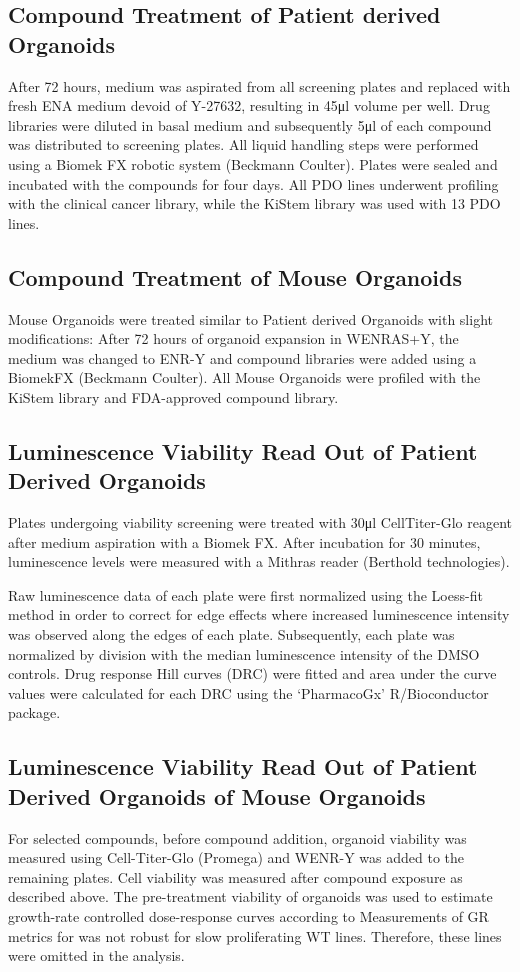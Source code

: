 \begin{flushleft}
\subsection{Compound Treatment of Patient derived Organoids}
After 72 hours, medium was aspirated from all screening plates and replaced with fresh ENA medium devoid of Y-27632, resulting in 45μl volume per well. Drug libraries were diluted in basal medium and subsequently 5μl of each compound was distributed to screening plates. 
All liquid handling steps were performed using a Biomek FX robotic system (Beckmann Coulter). Plates were sealed and incubated with the compounds for four days. All PDO lines underwent profiling with the clinical cancer library, while the KiStem library was used with 13 PDO lines.

\subsection{Compound Treatment of Mouse Organoids}
Mouse Organoids were treated similar to Patient derived Organoids with slight modifications: After 72 hours of organoid expansion in WENRAS+Y, the medium was changed to ENR-Y and compound libraries were added using a BiomekFX (Beckmann Coulter). All Mouse Organoids were profiled with the KiStem library and FDA-approved compound library.

\subsection{Luminescence Viability Read Out of Patient Derived Organoids}
Plates undergoing viability screening were treated with 30μl CellTiter-Glo reagent after medium aspiration with a Biomek FX. After incubation for 30 minutes, luminescence levels were measured with a Mithras reader (Berthold technologies).

Raw luminescence data of each plate were first normalized using the Loess-fit method in order to correct for edge effects where increased luminescence intensity was observed along the edges of each plate. Subsequently, each plate was normalized by division with the median luminescence intensity of the DMSO controls. Drug response Hill curves (DRC) were fitted and area under the curve values were calculated for each DRC using the ‘PharmacoGx’ \cite{Smirnov2016-ah} R/Bioconductor package.

\subsection{Luminescence Viability Read Out of Patient Derived Organoids of Mouse Organoids}
For selected compounds, before compound addition, organoid viability was measured using Cell-Titer-Glo (Promega) and WENR-Y was added to the remaining plates. Cell viability was measured after compound exposure as described above. The pre-treatment viability of organoids was used to estimate growth-rate controlled dose-response curves according to \cite{Hafner2016-yr} Measurements of GR metrics for was not robust for slow proliferating WT lines. Therefore, these lines were omitted in the analysis.


\end{flushleft}
